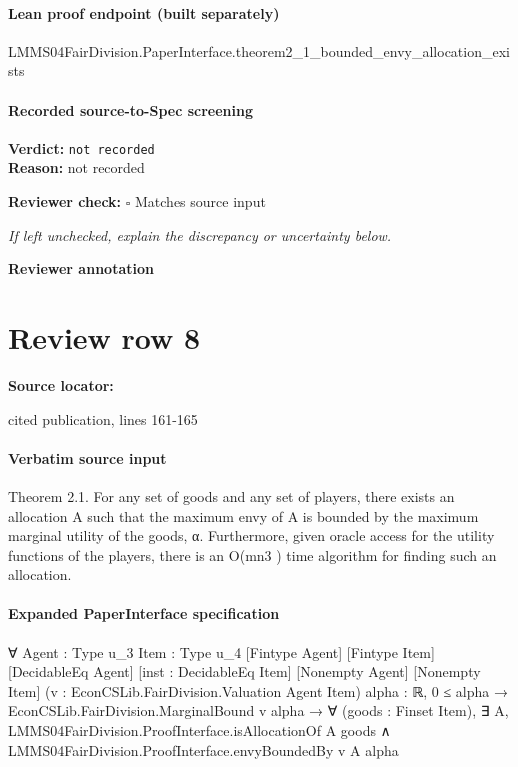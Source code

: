 \documentclass[10pt]{article}
\newcommand{\reviewerbox}{%
  \par\noindent\fbox{\parbox{0.96\linewidth}{\rule{0pt}{0.38in}}}\par
}
\newcommand{\reviewmatch}[1]{%
  \par\noindent\textbf{Reviewer check:} $\square$\; #1\par
  \noindent\emph{If left unchecked, explain the discrepancy or uncertainty below.}\par
}
\begin{document}
\paragraph{Lean proof endpoint (built separately)}\begin{ReviewVerbatim}
LMMS04FairDivision.PaperInterface.theorem2_1_bounded_envy_allocation_exists
\end{ReviewVerbatim}

\paragraph{Recorded source-to-Spec screening}
\textbf{Verdict:} \texttt{not recorded}
\\
\textbf{Reason:} not recorded
\reviewmatch{Matches source input}
\noindent\textbf{Reviewer annotation}\par
\reviewerbox
\clearpage
\hypertarget{source-claim-c24c330509cb89e7}{}
\section*{Review row 8}
\textbf{Source locator:} {\footnotesize\raggedright cited publication, lines 161-\allowbreak{}165\par}
\paragraph{Verbatim source input}
\begin{ReviewVerbatim}
Theorem 2.1. For any set of goods and any set of players, there exists an allocation A such that the maximum envy
of A is bounded by the maximum marginal utility of the
goods, α. Furthermore, given oracle access for the utility
functions of the players, there is an O(mn3 ) time algorithm
for finding such an allocation.
\end{ReviewVerbatim}


\paragraph{Expanded PaperInterface specification}
\begin{ReviewVerbatim}
∀ {Agent : Type u_3} {Item : Type u_4} [Fintype Agent] [Fintype Item] [DecidableEq Agent] [inst : DecidableEq Item]
  [Nonempty Agent] [Nonempty Item] (v : EconCSLib.FairDivision.Valuation Agent Item) {alpha : ℝ},
  0 ≤ alpha →
    EconCSLib.FairDivision.MarginalBound v alpha →
      ∀ (goods : Finset Item),
        ∃ A,
          LMMS04FairDivision.ProofInterface.isAllocationOf A goods ∧
            LMMS04FairDivision.ProofInterface.envyBoundedBy v A alpha
\end{ReviewVerbatim}
\end{document}
